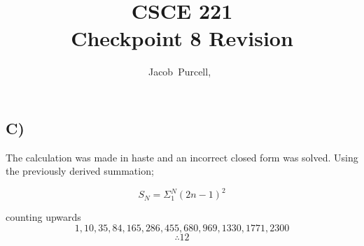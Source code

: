 \documentclass[journal]{IEEEtran}
\begin{document}
\title{CSCE 221 \\ Checkpoint 8 Revision}

\author{Jacob~Purcell,~}

\maketitle
\section{}
\subsection*{C)}
The calculation was made in haste and an incorrect closed form was solved. 
Using the previously derived summation;

\begin{equation}
    S_N = \Sigma_1^N (2n-1)^2
\end{equation}

counting upwards
$$1, 10, 35, 84, 165, 286, 455, 680, 969, 1330, 1771, 2300$$
$$\boxed{\therefore 12}$$
\end{document}
